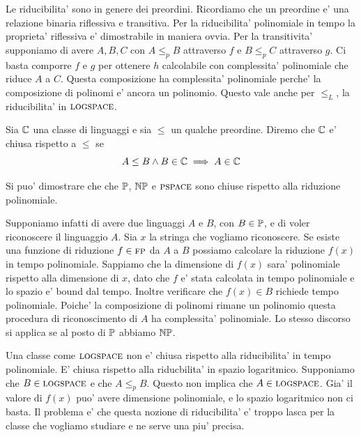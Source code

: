 Le riducibilita' sono in genere dei preordini. Ricordiamo che un preordine e' una relazione binaria
riflessiva e transitiva. Per la riducibilita' polinomiale in tempo la proprieta' riflessiva e'
dimostrabile in maniera ovvia. Per la transitivita' supponiamo di avere $A,B,C$ con $A \leq_{p} B$
attraverso $f$ e $B \leq_{p} C$ attraverso $g$. Ci basta comporre $f$ e $g$ per ottenere $h$
calcolabile con complessita' polinomiale che riduce $A$ a $C$. Questa composizione ha complessita'
polinomiale perche' la composizione di polinomi e' ancora un polinomio. Questo vale anche per
$\leq_{L}$, la riducibilita' in $\textsc{logspace}$.


\begin{defn}
    Sia $\mathbb{C}$ una classe di linguaggi e sia $\leq$ un qualche preordine. Diremo che $\mathbb{C}$ e'
    chiusa rispetto a $\leq$ se
    \begin{equation*}
        A \leq B \land B \in \mathbb{C} \implies A \in \mathbb{C}
    \end{equation*}
\end{defn}

Si puo' dimostrare che che $\mathbb{P}$, $\mathbb{NP}$ e $\textsc{pspace}$ sono chiuse rispetto alla riduzione
polinomiale.

Supponiamo infatti di avere due linguaggi $A$ e $B$, con $B \in \mathbb{P}$, e di voler riconoscere il
linguaggio $A$. Sia $x$ la stringa che vogliamo riconoscere. Se esiste una funzione di riduzione $f
\in \textsc{fp}$ da $A$ a $B$ possiamo calcolare la riduzione $f(x)$ in tempo polinomiale.  Sappiamo che la
dimensione di $f(x)$ sara' polinomiale rispetto alla dimensione di $x$, dato che $f$ e' stata
calcolata in tempo polinomiale e lo spazio e' bound dal tempo. Inoltre verificare che $f(x) \in B$
richiede tempo polinomiale. Poiche' la composizione di polinomi rimane un polinomio questa procedura
di riconoscimento di $A$ ha complessita' polinomiale. Lo stesso discorso si applica se al posto di
$\mathbb{P}$ abbiamo $\mathbb{NP}$.

Una classe come $\textsc{logspace}$ non e' chiusa rispetto alla riducibilita' in tempo polinomiale. E'
chiusa rispetto alla riducbilita' in spazio logaritmico. Supponiamo che $B \in \textsc{logspace}$ e che $A
\leq_{p} B$. Questo non implica che $A \in \textsc{logspace}$. Gia' il valore di $f(x)$ puo' avere
dimensione polinomiale, e lo spazio logaritmico non ci basta. Il problema e' che questa nozione di
riducibilita' e' troppo lasca per la classe che vogliamo studiare e ne serve una piu' precisa.

